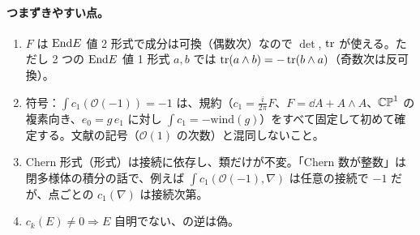 \paragraph{つまずきやすい点。}
\begin{enumerate}
\item $F$ は $\mathrm{End} E$ 値 2 形式で成分は可換（偶数次）なので $\det$, $\operatorname{tr}$ が使える。ただし 2 つの $\mathrm{End} E$ 値 1 形式 $a,b$ では $\operatorname{tr}(a\wedge b)=-\operatorname{tr}(b\wedge a)$（奇数次は反可換）。
\item 符号：$\int c_1(\mathcal O(-1))=-1$ は、規約（$c_1=\frac i{2\pi}F$、$F=\dd A+A\wedge A$、$\mathbb{CP}^1$ の複素向き、$e_0=g\,e_1$ に対し $\int c_1=-\mathrm{wind}(g)$）をすべて固定して初めて確定する。文献の記号（$\mathcal O(1)$ の次数）と混同しないこと。
\item Chern 形式（形式）は接続に依存し、類だけが不変。「Chern 数が整数」は閉多様体の積分の話で、例えば $\int c_1(\mathcal O(-1),\nabla)$ は任意の接続で $-1$ だが、点ごとの $c_1(\nabla)$ は接続次第。
\item $c_k(E)\ne0\Rightarrow E$ 自明でない、の逆は偽。
\end{enumerate}

